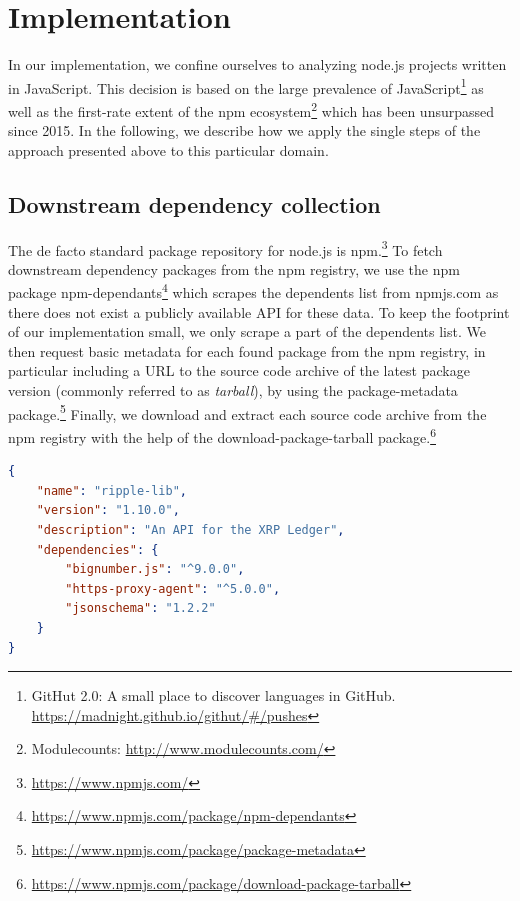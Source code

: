 \section{Implementation}
\label{sec:implementation}

In our implementation, we confine ourselves to analyzing node.js projects written in JavaScript.
This decision is based on the large prevalence of JavaScript\footnote{GitHut 2.0: A small place to discover languages in GitHub. \url{https://madnight.github.io/githut/\#/pushes}} as well as the first-rate extent of the npm ecosystem\footnote{Modulecounts: \url{http://www.modulecounts.com/}} which has been unsurpassed since 2015.
In the following, we describe how we apply the single steps of the approach presented above to this particular domain.

\subsection{Downstream dependency collection}
\label{sec:implementation/dependency_collection}

The de facto standard package repository for node.js is npm.\footnote{\url{https://www.npmjs.com/}}
To fetch downstream dependency packages from the npm registry, we use the npm package npm-dependants\footnote{\url{https://www.npmjs.com/package/npm-dependants}} which scrapes the dependents list from npmjs.com as there does not exist a publicly available API for these data.
To keep the footprint of our implementation small, we only scrape a part of the dependents list.
We then request basic metadata for each found package from the npm registry, in particular including a URL to the source code archive of the latest package version (commonly referred to as \emph{tarball}), by using the package-metadata package.\footnote{\url{https://www.npmjs.com/package/package-metadata}}
Finally, we download and extract each source code archive from the npm registry with the help of the download-package-tarball package.\footnote{\url{https://www.npmjs.com/package/download-package-tarball}}

\begin{lstlisting}[language=json,
	label=sec:implementation/package.json,
	caption={An example \code{package.json} manifest file for the \code{ripple-lib} package specifying multiple dependencies (truncated).},
	float=tpb,
	floatplacement=tbp,
	abovecaptionskip=-5pt
]
{
	"name": "ripple-lib",
	"version": "1.10.0",
	"description": "An API for the XRP Ledger",
	"dependencies": {
		"bignumber.js": "^9.0.0",
		"https-proxy-agent": "^5.0.0",
		"jsonschema": "1.2.2"
	}
}
\end{lstlisting}

